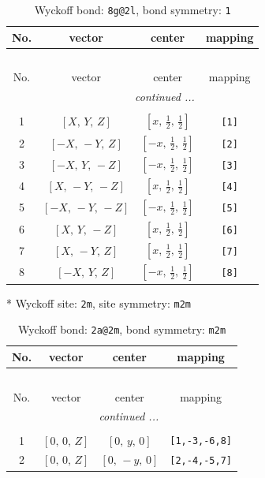 \documentclass[fleqn,8pt]{jsarticle}
\begin{document}
\begin{longtable}{cccc}
\caption{Wyckoff bond: {\tt 8g@2l}, bond symmetry: {\tt 1}}
 \\
 \hline \hline
No. & vector & center & mapping \\ \hline \endfirsthead

\multicolumn{3}{l}{\tablename\ \thetable{}} \\
 \hline \hline
No. & vector & center & mapping \\ \hline \endhead

 \hline \hline
\multicolumn{3}{r}{\footnotesize\it continued ...} \\ \endfoot

 \hline \hline
\multicolumn{3}{r}{} \\ \endlastfoot

1 & $\left[ X,\, Y,\, Z \right]$ & $\left[ x,\, \frac{1}{2},\, \frac{1}{2} \right]$ & {\tt [1]} \\ \hline
2 & $\left[ - X,\, - Y,\, Z \right]$ & $\left[ - x,\, \frac{1}{2},\, \frac{1}{2} \right]$ & {\tt [2]} \\ \hline
3 & $\left[ - X,\, Y,\, - Z \right]$ & $\left[ - x,\, \frac{1}{2},\, \frac{1}{2} \right]$ & {\tt [3]} \\ \hline
4 & $\left[ X,\, - Y,\, - Z \right]$ & $\left[ x,\, \frac{1}{2},\, \frac{1}{2} \right]$ & {\tt [4]} \\ \hline
5 & $\left[ - X,\, - Y,\, - Z \right]$ & $\left[ - x,\, \frac{1}{2},\, \frac{1}{2} \right]$ & {\tt [5]} \\ \hline
6 & $\left[ X,\, Y,\, - Z \right]$ & $\left[ x,\, \frac{1}{2},\, \frac{1}{2} \right]$ & {\tt [6]} \\ \hline
7 & $\left[ X,\, - Y,\, Z \right]$ & $\left[ x,\, \frac{1}{2},\, \frac{1}{2} \right]$ & {\tt [7]} \\ \hline
8 & $\left[ - X,\, Y,\, Z \right]$ & $\left[ - x,\, \frac{1}{2},\, \frac{1}{2} \right]$ & {\tt [8]} \\
\end{longtable}
* Wyckoff site: {\tt 2m}, site symmetry: {\tt m2m}
\renewcommand{\arraystretch}{1.2}
\begin{longtable}{cccc}
\caption{Wyckoff bond: {\tt 2a@2m}, bond symmetry: {\tt m2m}}
 \\
 \hline \hline
No. & vector & center & mapping \\ \hline \endfirsthead

\multicolumn{3}{l}{\tablename\ \thetable{}} \\
 \hline \hline
No. & vector & center & mapping \\ \hline \endhead

 \hline \hline
\multicolumn{3}{r}{\footnotesize\it continued ...} \\ \endfoot

 \hline \hline
\multicolumn{3}{r}{} \\ \endlastfoot

1 & $\left[ 0,\, 0,\, Z \right]$ & $\left[ 0,\, y,\, 0 \right]$ & {\tt [1,-3,-6,8]} \\ \hline
2 & $\left[ 0,\, 0,\, Z \right]$ & $\left[ 0,\, - y,\, 0 \right]$ & {\tt [2,-4,-5,7]} \\
\end{longtable}
\end{document}
